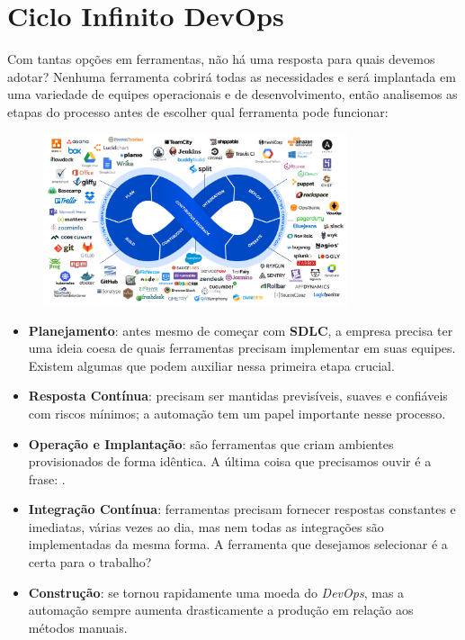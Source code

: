 \documentclass[fleqn,10pt]{SelfArx} %
\begin{document}
\section*{Ciclo Infinito DevOps}
Com tantas opções em ferramentas, não há uma resposta  para quais devemos adotar? Nenhuma ferramenta cobrirá todas as necessidades e será implantada em uma variedade de equipes operacionais e de desenvolvimento, então analisemos as etapas do processo antes de escolher qual ferramenta pode funcionar:
\begin{figure}[H]
	\centering
	\includegraphics[width=0.8\textwidth]{imagens/devops}
\end{figure}

\begin{itemize}
	\item \textbf{Planejamento}: antes mesmo de começar com \textbf{SDLC}, a empresa precisa ter uma ideia coesa de quais ferramentas precisam implementar em suas equipes. Existem algumas que podem auxiliar nessa primeira etapa crucial.
	\item \textbf{Resposta Contínua}: precisam ser mantidas previsíveis, suaves e confiáveis com riscos mínimos; a automação tem um papel importante nesse processo.
	\item \textbf{Operação e Implantação}: são ferramentas que criam ambientes provisionados de forma idêntica. A última coisa que precisamos ouvir é a frase: .
	\item \textbf{Integração Contínua}: ferramentas precisam fornecer respostas constantes e imediatas, várias vezes ao dia, mas nem todas as integrações são implementadas da mesma forma. A ferramenta que desejamos selecionar é a certa para o trabalho?
	\item \textbf{Construção}: se tornou rapidamente uma moeda do \textit{DevOps}, mas a automação sempre aumenta drasticamente a produção em relação aos métodos manuais.
\end{itemize}
\end{document}
